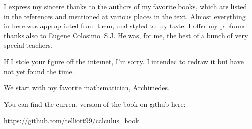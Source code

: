 \documentclass[11pt, oneside]{article}
\begin{document}
I express my sincere thanks to the authors of my favorite books, which are listed in the references and mentioned at various places in the text.  Almost everything in here was appropriated from them, and styled to my taste.  I offer my profound thanks also to Eugene Colosimo, S.J.  He was, for me, the best of a bunch of very special teachers.

If I stole your figure off the internet, I'm sorry.  I intended to redraw it but have not yet found the time.  

We start with my favorite mathematician, Archimedes.

You can find the current version of the book on github here:

\url{https://github.com/telliott99/calculus_book}
\end{document}
